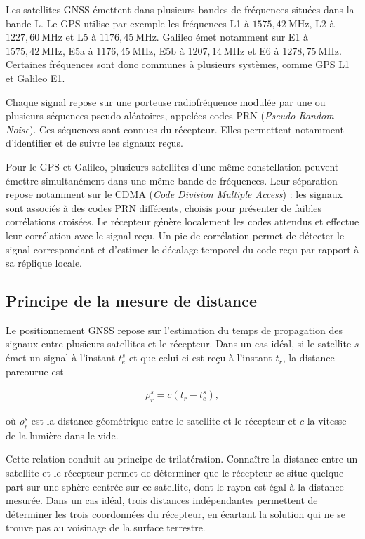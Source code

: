 Les satellites GNSS émettent dans plusieurs bandes de fréquences situées dans
la bande L. Le GPS utilise par exemple les fréquences L1 à
$1575{,}42~\mathrm{MHz}$, L2 à $1227{,}60~\mathrm{MHz}$ et L5 à
$1176{,}45~\mathrm{MHz}$. Galileo émet notamment sur E1 à
$1575{,}42~\mathrm{MHz}$, E5a à $1176{,}45~\mathrm{MHz}$, E5b à
$1207{,}14~\mathrm{MHz}$ et E6 à $1278{,}75~\mathrm{MHz}$. Certaines
fréquences sont donc communes à plusieurs systèmes, comme GPS L1 et Galileo E1.

Chaque signal repose sur une porteuse radiofréquence modulée par une ou
plusieurs séquences pseudo-aléatoires, appelées codes PRN
(\textit{Pseudo-Random Noise}). Ces séquences sont connues du récepteur. Elles
permettent notamment d'identifier et de suivre les signaux reçus.

Pour le GPS et Galileo, plusieurs satellites d'une même constellation peuvent
émettre simultanément dans une même bande de fréquences. Leur séparation
repose notamment sur le CDMA (\textit{Code Division Multiple Access}) :
les signaux sont associés à des codes PRN différents, choisis pour présenter
de faibles corrélations croisées. Le récepteur génère localement les codes
attendus et effectue leur corrélation avec le signal reçu. Un pic de
corrélation permet de détecter le signal correspondant et d'estimer le
décalage temporel du code reçu par rapport à sa réplique locale.


\subsection{Principe de la mesure de distance}

Le positionnement GNSS repose sur l'estimation du temps de propagation des
signaux entre plusieurs satellites et le récepteur. Dans un cas idéal, si le
satellite $s$ émet un signal à l'instant $t_e^s$ et que celui-ci est reçu à
l'instant $t_r$, la distance parcourue est

\begin{align}
\rho_r^s = c\left(t_r-t_e^s\right),
\label{eq:geometric_time_range}
\end{align}

où $\rho_r^s$ est la distance géométrique entre le satellite et le récepteur et
$c$ la vitesse de la lumière dans le vide.

Cette relation conduit au principe de trilatération. Connaître la distance entre 
un satellite et le récepteur permet de déterminer que le récepteur se situe quelque 
part sur une sphère centrée sur ce satellite, dont le rayon est égal à la distance 
mesurée. Dans un cas idéal,
trois distances indépendantes permettent de déterminer les trois coordonnées
du récepteur, en écartant la solution qui ne se trouve pas au voisinage de la
surface terrestre.


